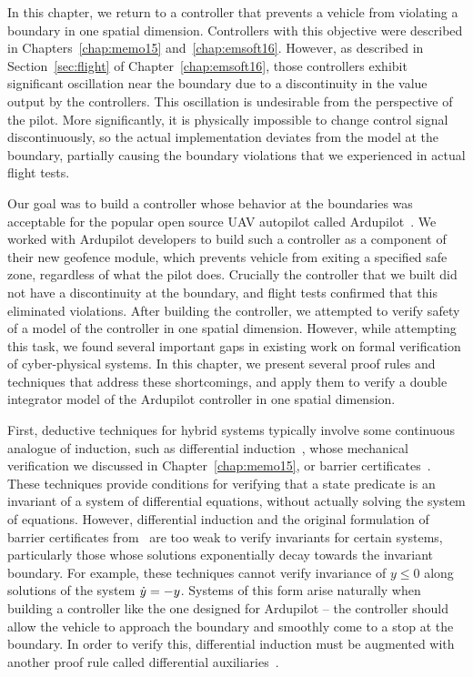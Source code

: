 In this chapter, we return to a controller that prevents a vehicle from
violating a boundary in one spatial dimension. Controllers with this
objective were described in Chapters~\ref{chap:memo15}
and~\ref{chap:emsoft16}. However, as described in Section~\ref{sec:flight}
of Chapter~\ref{chap:emsoft16}, those controllers exhibit significant
oscillation near the boundary due to a discontinuity in the value output by
the controllers. This oscillation is undesirable from the perspective of
the pilot. More significantly, it is physically impossible to change
control signal discontinuously, so the actual implementation deviates from
the model at the boundary, partially causing the boundary violations that
we experienced in actual flight tests.

Our goal was to build a controller whose behavior at the boundaries was
acceptable for the popular open source UAV autopilot called
Ardupilot~\cite{ardupilot}. We worked with Ardupilot developers to build
such a controller as a component of their new geofence module, which
prevents vehicle from exiting a specified safe zone, regardless of what the
pilot does. Crucially the controller that we built did not have a
discontinuity at the boundary, and flight tests confirmed that this
eliminated violations. After building the controller, we attempted to
verify safety of a model of the controller in one spatial dimension.
However, while attempting this task, we found several important gaps in
existing work on formal verification of cyber-physical systems. In this
chapter, we present several proof rules and techniques that address these
shortcomings, and apply them to verify a double integrator model of the
Ardupilot controller in one spatial dimension.

First, deductive techniques for hybrid systems typically involve some
continuous analogue of induction, such as differential
induction~\cite{Ghorbal14diffinv}, whose mechanical verification we
discussed in Chapter~\ref{chap:memo15}, or barrier
certificates~\cite{prajna04barrier}. These techniques provide conditions
for verifying that a state predicate is an invariant of a system of
differential equations, without actually solving the system of
equations. However, differential induction and the original formulation of
barrier certificates from~\cite{prajna04barrier} are too weak to verify
invariants for certain systems, particularly those whose solutions
exponentially decay towards the invariant boundary. For example, these
techniques cannot verify invariance of $y \leq 0$ along solutions of the
system $\dot{y} = -y$. Systems of this form arise naturally when building a
controller like the one designed for Ardupilot -- the controller should
allow the vehicle to approach the boundary and smoothly come to a stop at
the boundary. In order to verify this, differential induction must be
augmented with another proof rule called differential
auxiliaries~\cite{Platzer12diffcut}.

